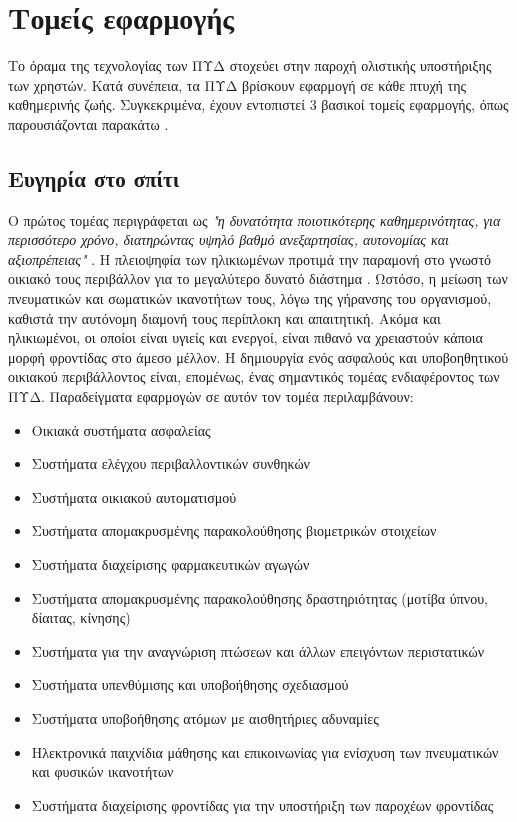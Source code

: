 \section{Τομείς εφαρμογής}
Το όραμα της τεχνολογίας των ΠΥΔ στοχεύει στην παροχή ολιστικής υποστήριξης των χρηστών. Κατά συνέπεια, τα ΠΥΔ βρίσκουν εφαρμογή σε κάθε πτυχή της καθημερινής ζωής.
Συγκεκριμένα, έχουν εντοπιστεί 3 βασικοί τομείς εφαρμογής, όπως παρουσιάζονται παρακάτω \cite{broek}.

\subsection{Ευγηρία στο σπίτι}
Ο πρώτος τομέας περιγράφεται ως \textit{"η δυνατότητα ποιοτικότερης καθημερινότητας, για περισσότερο χρόνο, διατηρώντας υψηλό βαθμό ανεξαρτησίας, αυτονομίας και αξιοπρέπειας"} \cite{broek}.
Η πλειοψηφία των ηλικιωμένων προτιμά την παραμονή στο γνωστό οικιακό τους περιβάλλον για το μεγαλύτερο δυνατό διάστημα \cite{Mosca2016}.
Ωστόσο, η μείωση των πνευματικών και σωματικών ικανοτήτων τους, λόγω της γήρανσης του οργανισμού, καθιστά την αυτόνομη διαμονή τους περίπλοκη και απαιτητική.
Ακόμα και ηλικιωμένοι, οι οποίοι είναι υγιείς και ενεργοί, είναι πιθανό να χρειαστούν κάποια μορφή φροντίδας στο άμεσο μέλλον.
Η δημιουργία ενός ασφαλούς και υποβοηθητικού οικιακού περιβάλλοντος είναι, επομένως, ένας σημαντικός τομέας ενδιαφέροντος των ΠΥΔ.
Παραδείγματα εφαρμογών σε αυτόν τον τομέα περιλαμβάνουν:
\begin{itemize}
    \item Οικιακά συστήματα ασφαλείας
    \item Συστήματα ελέγχου περιβαλλοντικών συνθηκών
    \item Συστήματα οικιακού αυτοματισμού
    \item Συστήματα απομακρυσμένης παρακολούθησης βιομετρικών στοιχείων
    \item Συστήματα διαχείρισης φαρμακευτικών αγωγών
    \item Συστήματα απομακρυσμένης παρακολούθησης δραστηριότητας (μοτίβα ύπνου, δίαιτας, κίνησης)
    \item Συστήματα για την αναγνώριση πτώσεων και άλλων επειγόντων περιστατικών
    \item Συστήματα υπενθύμισης και υποβοήθησης σχεδιασμού
    \item Συστήματα υποβοήθησης ατόμων με αισθητήριες αδυναμίες
    \item Ηλεκτρονικά παιχνίδια μάθησης και επικοινωνίας για ενίσχυση των πνευματικών και φυσικών ικανοτήτων
    \item Συστήματα διαχείρισης φροντίδας για την υποστήριξη των παροχέων φροντίδας
\end{itemize}{}

